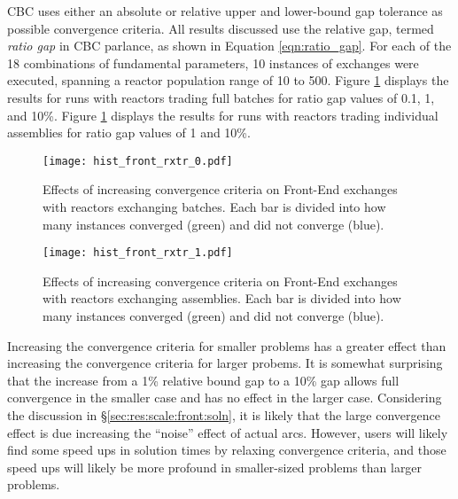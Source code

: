 CBC uses either an absolute or relative upper and lower-bound gap tolerance as
possible convergence criteria. All results discussed use the relative gap,
termed \textit{ratio gap} in CBC parlance, as shown in Equation
\ref{eqn:ratio_gap}. For each of the 18 combinations of fundamental parameters,
10 instances of exchanges were executed, spanning a reactor population range of
10 to 500. Figure \ref{fig:hist_front_rxtr_0} displays the results for runs with
reactors trading full batches for ratio gap values of 0.1, 1, and 10\%. Figure
\ref{fig:hist_front_rxtr_0} displays the results for runs with reactors trading
individual assemblies for ratio gap values of 1 and 10\%.

\begin{figure}[h!]
  \begin{center}
    \texttt{[image: hist\_front\_rxtr\_0.pdf]}
    \caption[]{
      \label{fig:hist_front_rxtr_0}
      Effects of increasing convergence criteria on Front-End exchanges with
      reactors exchanging batches. Each bar is divided into how many instances
      converged (green) and did not converge (blue). }
  \end{center}
\end{figure}

\begin{figure}[h!]
  \begin{center}
    \texttt{[image: hist\_front\_rxtr\_1.pdf]}
    \caption[]{
      \label{fig:hist_front_rxtr_1}
      Effects of increasing convergence criteria on Front-End exchanges with
      reactors exchanging assemblies. Each bar is divided into how many instances
      converged (green) and did not converge (blue).}
  \end{center}
\end{figure}

Increasing the convergence criteria for smaller problems has a greater effect
than increasing the convergence criteria for larger probems. It is somewhat
surprising that the increase from a 1\% relative bound gap to a 10\% gap allows
full convergence in the smaller case and has no effect in the larger
case. Considering the discussion in \S \ref{sec:res:scale:front:soln}, it is
likely that the large convergence effect is due increasing the ``noise'' effect
of actual arcs. However, users will likely find some speed ups in solution times
by relaxing convergence criteria, and those speed ups will likely be more
profound in smaller-sized problems than larger problems.

